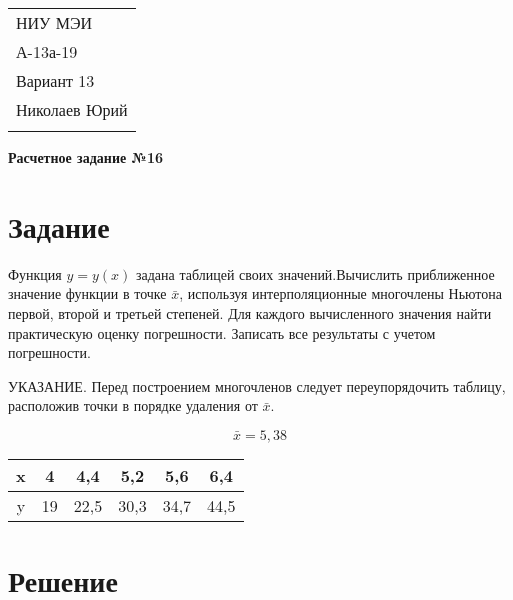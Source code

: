 \documentclass[a4paper,12pt]{article} %
\begin{document}
\thispagestyle{empty} 

\begin{tabular}{p{15.5cm}} 
НИУ МЭИ \\ А-13а-19  \\ Вариант 13 \\ Николаев Юрий\\
\hline 
\\
\end{tabular} 

\vspace*{0.3cm}

\begin{center} 
	{\Large \bf Расчетное задание №16} 
	\vspace{2mm}
\end{center}  

\vspace{0.4cm}


\section{Задание}
Функция $y = y(x)$ задана таблицей своих значений.Вычислить приближенное значение функции в точке $\bar x$, используя интерполяционные многочлены Ньютона первой, второй и третьей степеней. Для каждого вычисленного значения найти практическую оценку погрешности. Записать все результаты с учетом погрешности.

\vspace{0.4cm}

УКАЗАНИЕ. Перед построением многочленов следует переупорядочить таблицу, расположив точки в порядке удаления от $\bar x$.

$$\bar x = 5,38$$

\begin{center}
\begin{tabular}{| c | c | c | c | c | c |}
\hline
    x & 4 & 4,4 & 5,2 & 5,6 & 6,4 \\ \hline
    y & 19 & 22,5 & 30,3 & 34,7 & 44,5 \\
\hline
\end{tabular}
\end{center}

\section{Решение}
\end{document}
